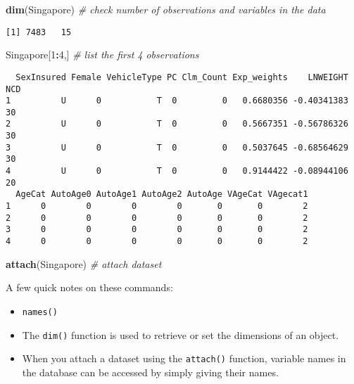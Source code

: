 \documentclass[]{book}
\newenvironment{Shaded}{\begin{snugshade}}{\end{snugshade}}
\newcommand{\KeywordTok}[1]{\textcolor[rgb]{0.13,0.29,0.53}{\textbf{#1}}}
\newcommand{\DecValTok}[1]{\textcolor[rgb]{0.00,0.00,0.81}{#1}}
\newcommand{\CommentTok}[1]{\textcolor[rgb]{0.56,0.35,0.01}{\textit{#1}}}
\newcommand{\OperatorTok}[1]{\textcolor[rgb]{0.81,0.36,0.00}{\textbf{#1}}}
\newcommand{\NormalTok}[1]{#1}
\providecommand{\tightlist}{%
  \setlength{\itemsep}{0pt}\setlength{\parskip}{0pt}}
\theoremstyle{definition}
\theoremstyle{definition}
\theoremstyle{definition}
\theoremstyle{remark}
\begin{document}
\begin{Shaded}
\begin{Highlighting}[]
\KeywordTok{dim}\NormalTok{(Singapore)  }\CommentTok{# check number of observations and variables in the data}
\end{Highlighting}
\end{Shaded}

\begin{verbatim}
[1] 7483   15
\end{verbatim}

\begin{Shaded}
\begin{Highlighting}[]
\NormalTok{Singapore[}\DecValTok{1}\OperatorTok{:}\DecValTok{4}\NormalTok{,]  }\CommentTok{# list the first 4 observations}
\end{Highlighting}
\end{Shaded}

\begin{verbatim}
  SexInsured Female VehicleType PC Clm_Count Exp_weights    LNWEIGHT NCD
1          U      0           T  0         0   0.6680356 -0.40341383  30
2          U      0           T  0         0   0.5667351 -0.56786326  30
3          U      0           T  0         0   0.5037645 -0.68564629  30
4          U      0           T  0         0   0.9144422 -0.08944106  20
  AgeCat AutoAge0 AutoAge1 AutoAge2 AutoAge VAgeCat VAgecat1
1      0        0        0        0       0       0        2
2      0        0        0        0       0       0        2
3      0        0        0        0       0       0        2
4      0        0        0        0       0       0        2
\end{verbatim}

\begin{Shaded}
\begin{Highlighting}[]
\KeywordTok{attach}\NormalTok{(Singapore)  }\CommentTok{# attach dataset}
\end{Highlighting}
\end{Shaded}

A few quick notes on these commands:

\begin{itemize}
\tightlist
\item
  \texttt{names()}
\item
  The \texttt{dim()} function is used to retrieve or set the dimensions
  of an object.
\item
  When you attach a dataset using the \texttt{attach()} function,
  variable names in the database can be accessed by simply giving their
  names.
\end{itemize}
\end{document}
